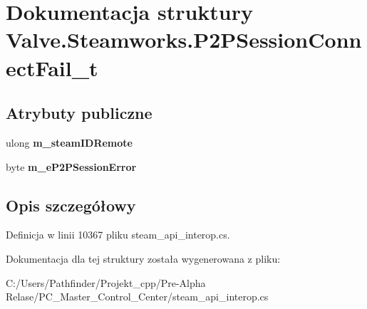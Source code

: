 \hypertarget{struct_valve_1_1_steamworks_1_1_p2_p_session_connect_fail__t}{}\section{Dokumentacja struktury Valve.\+Steamworks.\+P2\+P\+Session\+Connect\+Fail\+\_\+t}
\label{struct_valve_1_1_steamworks_1_1_p2_p_session_connect_fail__t}
\subsection*{Atrybuty publiczne}
\begin{DoxyCompactItemize}
\item 
\mbox{\label{struct_valve_1_1_steamworks_1_1_p2_p_session_connect_fail__t_a34da0ed0efc81d5840c4114c2e2a8390}} 
ulong {\bfseries m\+\_\+steam\+I\+D\+Remote}
\item 
\mbox{\label{struct_valve_1_1_steamworks_1_1_p2_p_session_connect_fail__t_a195a9f18aee87ff10e09e15a09f65857}} 
byte {\bfseries m\+\_\+e\+P2\+P\+Session\+Error}
\end{DoxyCompactItemize}


\subsection{Opis szczegółowy}


Definicja w linii 10367 pliku steam\+\_\+api\+\_\+interop.\+cs.



Dokumentacja dla tej struktury została wygenerowana z pliku\+:\begin{DoxyCompactItemize}
\item 
C\+:/\+Users/\+Pathfinder/\+Projekt\+\_\+cpp/\+Pre-\/\+Alpha Relase/\+P\+C\+\_\+\+Master\+\_\+\+Control\+\_\+\+Center/steam\+\_\+api\+\_\+interop.\+cs\end{DoxyCompactItemize}
